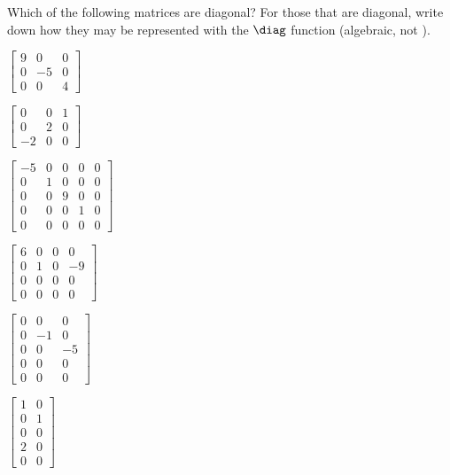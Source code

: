 \begin{exercise} \label{ex:} 
Which of the following matrices are diagonal? 
For those that are diagonal, write down how they may be represented with the \(\diag\) function (algebraic, not \script).

\begin{parts}
\item \(\begin{bmatrix} 9&0&0
\\0&-5&0
\\0&0&4 \end{bmatrix}\)

\item \(\begin{bmatrix} 0&0&1
\\0&2&0
\\-2&0&0 \end{bmatrix}\)

\item \(\begin{bmatrix} -5&0&0&0&0
\\0&1&0&0&0
\\0&0&9&0&0
\\0&0&0&1&0
\\0&0&0&0&0 \end{bmatrix}\)

\item \(\begin{bmatrix} 6&0&0&0
\\0&1&0&-9
\\0&0&0&0
\\0&0&0&0 \end{bmatrix}\)

\item \(\begin{bmatrix} 0&0&0
\\0&-1&0
\\0&0&-5
\\0&0&0
\\0&0&0 \end{bmatrix}\)

\item \(\begin{bmatrix} 1&0
\\0&1
\\0&0
\\2&0
\\0&0 \end{bmatrix}\)


\end{parts}
\end{exercise}
